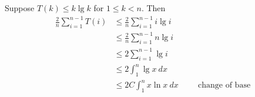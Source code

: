 Suppose $T(k) \leq k \lg k$ for $1 \leq k < n$.
Then
\begin{align*}
  \frac{2}{n} \sum_{i = 1}^{n - 1} T(i)
  &\leq \frac{2}{n} \sum_{i = 1}^{n - 1} i \lg i 
  \\
  &\leq \frac{2}{n} \sum_{i = 1}^{n - 1} n \lg i 
  \\
  &\leq 2 \sum_{i = 1}^{n - 1} \lg i 
  \\
  &\leq 2 \int_{1}^n \lg x \ dx
  \\
  &\leq 2 C \int_{1}^n x \ln x \ dx \hspace{1cm} \text{change of base}
  \\
\end{align*}
\begin{comment}
\begin{align*}
  \frac{2}{n} \sum_{i = 1}^{n - 1} T(i)
  &\leq \frac{2}{n} \sum_{i = 1}^{n - 1} i \lg i 
  \\
  &\leq 2 \sum_{i = 1}^{n - 1} \frac{i}{n} \lg i  
  \\
  &= 2 \sum_{i = 1}^{n - 1} \frac{i}{n} \lg \left( \frac{i}{n} \cdot n \right)
  \\
  &= 2 \sum_{i = 1}^{n - 1} \frac{i}{n} \left( \lg \frac{i}{n} + \lg n \right)
  \\
  &= 2 \sum_{i = 1}^{n - 1} \left( \frac{i}{n} \lg \frac{i}{n} + \frac{i}{n} \lg n \right)
  \\
  &= 2 \sum_{i = 1}^{n - 1} \frac{i}{n} \lg \frac{i}{n} + 2\sum_{i=1}^n \frac{i}{n} \lg n
  \\
  &= 2 \sum_{i = 1}^{n - 1} \frac{i}{n} \lg \frac{i}{n}
    +
    \frac{2 \lg n}{n}
    \sum_{i=1}^n i
  \\
  &= 2 \sum_{i = 1}^{n - 1} \frac{i}{n} \lg \frac{i}{n}
    +
    \frac{2 \lg n}{n}
    \cdot
    \frac{n(n - 1)}{2}
  \\
  &= 2 \sum_{i = 1}^{n - 1} \frac{i}{n} \lg \frac{i}{n}
    +
    (\lg n)(n - 1)
  \\
  &= 2 \sum_{i = 1}^{n - 1} \frac{i}{n} \lg \frac{i}{n}
    +
    n\lg n - \lg n
\end{align*}
\end{comment}


